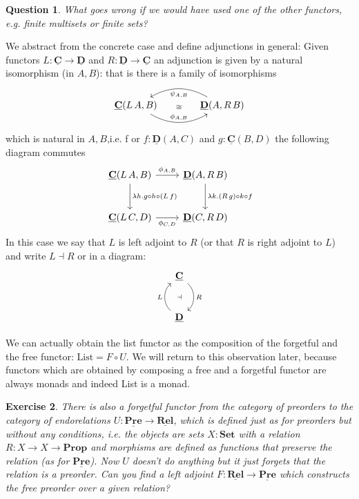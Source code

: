 \documentclass{article}
\newcommand{\Prop}{\mathbf{Prop}}
\newcommand{\Set}{\mathbf{Set}}
\newcommand{\cat}[1]{\underline{\mathbf{#1}}}
\newcommand{\List}{\mathrm{List}}
\newtheorem{exercise}{Exercise}
\newtheorem{question}[exercise]{Question}
\begin{document}
\begin{question}
  What goes wrong if we would have used one of the other functors, e.g. finite multisets or finite sets?
\end{question}

We abstract from the concrete case and define adjunctions in general: Given functors $L : \cat{C} \to \cat{D}$ and $R : \cat{D} \to \cat{C}$ an adjunction is given by a natural isomorphism (in $A,B$): that is there is a family of isomorphisms 
\[\begin{tikzcd}[column sep = large]
\cat{C}(L\,A,B) \arrow[r,"\phi_{A,B}",bend right,"\cong" above=11] & \cat{D}(A,R\,B) \arrow[l,"\psi_{A,B}",bend right]
\end{tikzcd}\]
which is natural in $A,B$,i.e. f or $f:\cat{D}(A,C)$ and $g : \cat{C}(B,D)$ the following diagram commutes
\[\begin{tikzcd}[row sep = large]
    \cat{C}(L\,A,B) \arrow[r,"\phi_{A,B}"] \arrow[d,"\lambda h. g\circ h \circ (L\,f)"] & \cat{D}(A,R\,B)  \arrow[d,"\lambda k. (R\,g)\circ k \circ f"] \\
    \cat{C}(L\,C,D) \arrow[r,"\phi_{C,D}" below]  & \cat{D}(C,R\,D)  
\end{tikzcd}\]
In this case we say that $L$ is left adjoint to $R$ (or that $R$ is right adjoint to $L$) and write $L \dashv R$ or in a diagram:
\[\begin{tikzcd}[row sep=large]
\cat{C} \arrow[d,bend left = 50,"R" right,"\dashv" left = 10] \\ 
\cat{D} \arrow[u,bend left = 50,"L" left, ]
\end{tikzcd}\]

We can actually obtain the list functor as the composition of the forgetful and the free functor: $\List = F \circ U$. We will return to this observation later, because functors which are obtained by composing a free and a forgetful functor are always monads and indeed List is a monad.

\begin{exercise}
\label{ex:free-preorder}
  There is also a forgetful functor from the category of preorders to the category of endorelations $U : \cat{Pre} \to \cat{Rel}$, which is defined just as for preorders but without any conditions, i.e. the objects are sets $X:\Set$ with a relation $R : X\to X\to\Prop$ and morphisms are defined as functions that preserve the relation (as for $\cat{Pre}$). Now $U$ doesn't do anything but it just forgets that the relation is a preorder. Can you find a left adjoint $F : \cat{Rel} \to \cat{Pre}$ which constructs the free preorder over a given relation?
\end{exercise}
\end{document}
